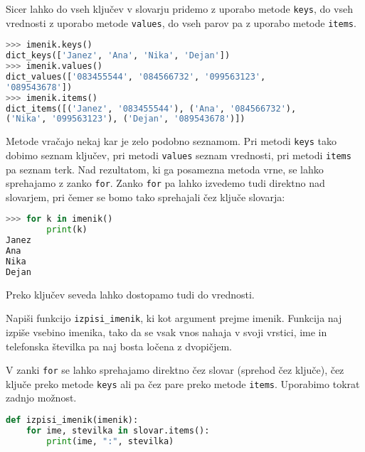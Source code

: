 Sicer lahko do vseh ključev v slovarju pridemo z uporabo metode \texttt{keys}, do vseh vrednosti z uporabo metode \texttt{values}, do vseh parov pa z uporabo metode \texttt{items}. 
\begin{lstlisting}[language=Python]
>>> imenik.keys()
dict_keys(['Janez', 'Ana', 'Nika', 'Dejan'])
>>> imenik.values()
dict_values(['083455544', '084566732', '099563123', 
'089543678'])
>>> imenik.items()
dict_items([('Janez', '083455544'), ('Ana', '084566732'), 
('Nika', '099563123'), ('Dejan', '089543678')])
\end{lstlisting}
Metode vračajo nekaj kar je zelo podobno seznamom. Pri metodi \texttt{keys} tako dobimo seznam ključev, pri metodi \texttt{values} seznam vrednosti, pri metodi \texttt{items} pa seznam terk. Nad rezultatom, ki ga posamezna metoda vrne, se lahko sprehajamo z zanko \texttt{for}. Zanko \texttt{for} pa lahko izvedemo tudi direktno nad slovarjem, pri čemer se bomo tako sprehajali čez ključe slovarja:
\begin{lstlisting}[language=Python]
>>> for k in imenik()
        print(k)
Janez
Ana
Nika
Dejan
\end{lstlisting}
Preko ključev seveda lahko dostopamo tudi do vrednosti. 
\begin{zgled}
Napiši funkcijo \texttt{izpisi\_imenik}, ki kot argument prejme imenik. Funkcija naj izpiše vsebino imenika, tako da se vsak vnos nahaja v svoji vrstici, ime in telefonska številka pa naj bosta ločena z dvopičjem.
\end{zgled}
\begin{resitev}
V zanki \texttt{for} se lahko sprehajamo direktno čez slovar (sprehod čez ključe), čez ključe preko metode \texttt{keys} ali pa čez pare preko metode \texttt{items}. Uporabimo tokrat zadnjo možnost.
\begin{lstlisting}[language=Python]
def izpisi_imenik(imenik):
    for ime, stevilka in slovar.items():
        print(ime, ":", stevilka)   
\end{lstlisting}
\end{resitev}

